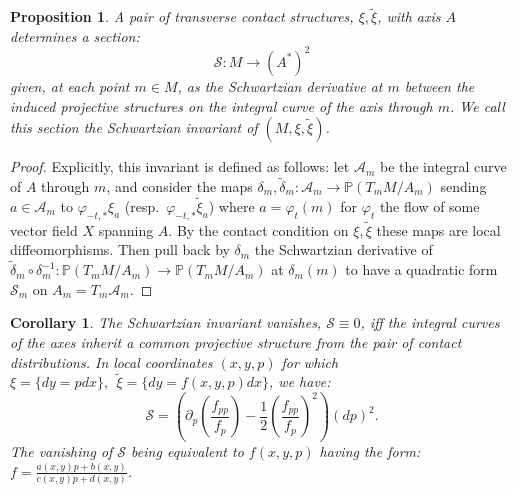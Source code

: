 \documentclass[10pt]{amsart}
\newcommand{\inv}{^{-1}}
\newcommand{\fe}{\varphi}
\newcommand{\del}{\partial}
\newtheorem{prop}[thm]{Proposition}
\newtheorem{coro}[thm]{Corollary}
\theoremstyle{definition}
\begin{document}
\begin{prop}\label{prop:Schwartz}
    A pair of transverse contact structures, $\xi, \tilde \xi$, with axis $A$ determines a section:
    \[ \mathcal{S}: M \to (A^*)^2 \]
    given, at each point $m\in M$, as the Schwartzian derivative at $m$ between the induced projective structures on the integral curve of the axis through $m$. 
    We call this section the {\em Schwartzian invariant} of $(M,\xi, \tilde \xi)$.
\end{prop}
\begin{proof}
    Explicitly, this invariant is defined as follows: let $\mathcal{A}_m$ be the integral curve of $A$ through $m$, and consider the maps $\delta_m, \tilde\delta_m : \mathcal{A}_m \to \mathbb{P}(T_mM/A_m)$ sending $a\in \mathcal{A}_m$ to $\fe_{-t,*}\xi_a$ (resp.~$\fe_{-t,*}\tilde \xi_a$) where $a = \fe_t(m)$ for $\fe_t$ the flow of some vector field $X$ spanning $A$. By the contact condition on $\xi, \tilde\xi$ these maps are local diffeomorphisms. Then pull back by $\delta_m$ the Schwartzian derivative of $\tilde\delta_m\circ\delta_m\inv:\mathbb{P}(T_mM/A_m) \to \mathbb{P}(T_mM/A_m)$ at $\delta_m(m)$ to have a quadratic  form $\mathcal{S}_m$ on $A_m = T_m\mathcal{A}_m$.
\end{proof}

\begin{coro}\label{rem:Schwartz}
    The Schwartzian invariant vanishes, $\mathcal{S}\equiv 0$, iff the integral curves of the axes inherit a {\em common} projective structure from the pair of contact distributions.
    In local coordinates $(x,y,p)$ for which $\xi = \{ dy = pdx\}, ~~\tilde \xi = \{ dy = f(x,y,p)dx\}$,
    we have:
    \[ \mathcal{S} = \left( \del_p\left(\frac{f_{pp}}{f_p}\right) - \frac12 \left(\frac{f_{pp}}{f_p}\right)^2  \right) (dp)^2.\]
     The vanishing of $\mathcal{S}$ being equivalent to $f(x,y,p)$ having the form: $f = \frac{a(x,y)p + b(x,y)}{c(x,y)p + d(x,y)}$.
\end{coro}
\end{document}

